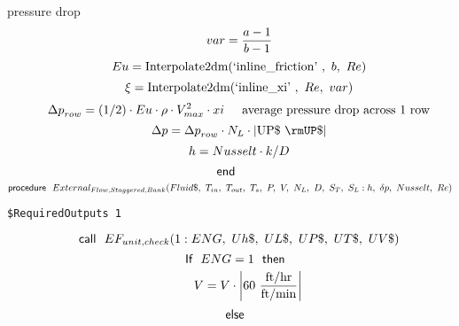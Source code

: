 \documentclass[10pt,fleqn]{article}
\newcommand{\F}[1]{\mbox{$#1$}}
\newcommand{\K}[1]{\mbox{\sf#1\ \ \mit}}
\newcommand{\KS}[1]{\mbox{\sf\ \ #1\ \ \mit}}
\newcommand{\SC}[1]{\mbox{`#1'}\  }
\newcommand{\V}[1]{\mbox{$ #1 $}}
\newcommand{\I}{\mbox{\hspace{0.20in}}}
\begin{document}
\vspace{0.10in}
\noindent
\rm pressure drop
\begin{equation}
\I \label{EES Eqn:220}
\V{var} =\frac {a-1}{ b-1 } 
\end{equation}
\begin{equation}
\I \label{EES Eqn:221}
\V{Eu} =\mbox{Interpolate2dm}{ \left( \SC{inline\_friction},\ b,\ \V{Re}  \right) } 
\end{equation}
\begin{equation}
\I \label{EES Eqn:222}
\xi=\mbox{Interpolate2dm}{ \left( \SC{inline\_xi},\ \V{Re} ,\ \V{var}  \right) } 
\end{equation}
\begin{equation}
\I \label{EES Eqn:223}
{\Delta p}_{row}= \left( 1/2 \right) \cdot \V{Eu} \cdot \rho\cdot V_{max}^{2}\cdot xi	 
\mbox{\I average pressure drop across 1 row}
\end{equation}
\begin{equation}
\I \label{EES Eqn:224}
{\Delta p}={\Delta p}_{row}\cdot N_{L}\cdot \rm { \left|UP\$\ {\rmUP\$} \right|} 
\end{equation}
\begin{equation}
\I \label{EES Eqn:225}
h=\V{Nusselt} \cdot k/D 
\end{equation}
\begin{equation}
\label{EES Eqn:226}
\K{end} 
\end{equation}
\vspace{0.1 in}
\begin{equation}
\label{EES Eqn:227}
\K{procedure} \F{External_{Flow,Staggered,Bank}}{ \left( Fluid\$,\ T_{in},\ T_{out},\ T_{s},\  P,\ V,\ N_{L},\ D,\ S_{T},\ S_{L}: h,\ {\delta p},\ \V{Nusselt} ,\ \V{Re}  \right) } 
\end{equation}
\begin{verbatim}
$RequiredOutputs 1
\end{verbatim}  \begin{equation}
\I \label{EES Eqn:228}
\K{call} \F{EF_{unit,check}}{ \left( 1:\V{ENG} ,\ Uh\$,\ UL\$,\ UP\$,\ UT\$,\ UV\$ \right) } 
\end{equation}
\begin{equation}
\I \label{EES Eqn:229}
\K{If} \V{ENG} =1 \KS{then} 
\end{equation}
\begin{equation}
\I \I \label{EES Eqn:230}
V=V\cdot \rm { \left|60\ \frac {\rm{ft/hr}}{\rm{ft/min}}\right|} 
\end{equation}
\begin{equation}
\I \label{EES Eqn:231}
\K{else} 
\end{equation}
\end{document}
